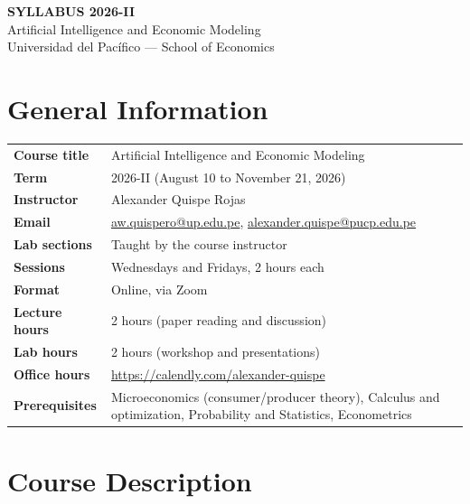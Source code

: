 \documentclass[11pt]{article}
\begin{document}
\begin{center}
{\Large\bfseries SYLLABUS 2026-II}\\[0.4em]
{\large Artificial Intelligence and Economic Modeling}\\[0.2em]
{\normalsize Universidad del Pac\'ifico --- School of Economics}
\end{center}

\vspace{0.6em}

\section{General Information}

\begin{tabular}{@{}p{4.2cm}p{11cm}@{}}
\textbf{Course title} & Artificial Intelligence and Economic Modeling \\
\textbf{Term} & 2026-II (August 10 to November 21, 2026) \\
\textbf{Instructor} & Alexander Quispe Rojas \\
\textbf{Email} & \href{mailto:aw.quispero@up.edu.pe}{aw.quispero@up.edu.pe}, \href{mailto:alexander.quispe@pucp.edu.pe}{alexander.quispe@pucp.edu.pe} \\
\textbf{Lab sections} & Taught by the course instructor \\
\textbf{Sessions} & Wednesdays and Fridays, 2 hours each \\
\textbf{Format} & Online, via Zoom \\
\textbf{Lecture hours} & 2 hours (paper reading and discussion) \\
\textbf{Lab hours} & 2 hours (workshop and presentations) \\
\textbf{Office hours} & \url{https://calendly.com/alexander-quispe} \\
\textbf{Prerequisites} & Microeconomics (consumer/producer theory), Calculus and optimization, Probability and Statistics, Econometrics \\
\end{tabular}

\section{Course Description}
\end{document}
